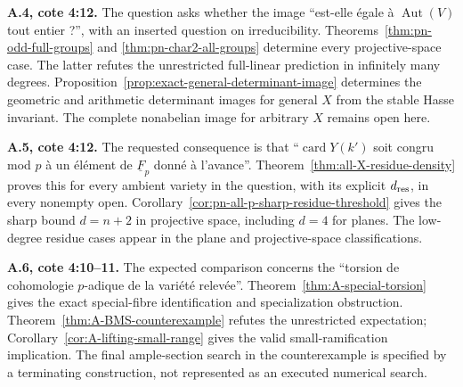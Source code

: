 \par\smallskip\noindent\textbf{A.4, cote 4:12.}
The question asks whether the image ``est-elle égale à
$\operatorname{Aut}(V)$ tout entier ?'', with an inserted question on
irreducibility.  Theorems~\ref{thm:pn-odd-full-groups} and
\ref{thm:pn-char2-all-groups} determine every projective-space case.
The latter refutes the unrestricted full-linear prediction in infinitely
many degrees.  Proposition~\ref{prop:exact-general-determinant-image}
determines the geometric and arithmetic determinant images for general
$X$ from the stable Hasse invariant.  The complete nonabelian image for
arbitrary $X$ remains open here.

\par\smallskip\noindent\textbf{A.5, cote 4:12.}
The requested consequence is that ``$\operatorname{card}Y(k')$ soit
congru mod $p$ à un élément de $\underline F_p$ donné à l'avance''.
Theorem~\ref{thm:all-X-residue-density} proves this for every ambient
variety in the question, with its explicit $d_{\rm res}$, in every
nonempty open.  Corollary~\ref{cor:pn-all-p-sharp-residue-threshold}
gives the sharp bound $d=n+2$ in projective space, including $d=4$
for planes.  The low-degree residue cases appear in the plane and
projective-space classifications.

\par\smallskip\noindent\textbf{A.6, cote 4:10--11.}
The expected comparison concerns the ``torsion de cohomologie
$p$-adique de la variété relevée''.
Theorem~\ref{thm:A-special-torsion} gives the exact special-fibre
identification and specialization obstruction.
Theorem~\ref{thm:A-BMS-counterexample} refutes the unrestricted
expectation; Corollary~\ref{cor:A-lifting-small-range} gives the
valid small-ramification implication.  The final ample-section search
in the counterexample is specified by a terminating construction,
not represented as an executed numerical search.
